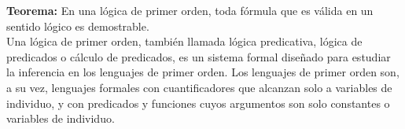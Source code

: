 \noindent \textbf{Teorema:} En una lógica de primer orden, toda fórmula que es válida en un sentido lógico es demostrable.\cite{Teorema_de_completitud} \\

\noindent Una lógica de primer orden, también llamada lógica predicativa, lógica de predicados o cálculo de predicados, es un sistema formal diseñado para estudiar la inferencia en los lenguajes de primer orden. Los lenguajes de primer orden son, a su vez, lenguajes formales con cuantificadores que alcanzan solo a variables de individuo, y con predicados y funciones cuyos argumentos son solo constantes o variables de individuo.